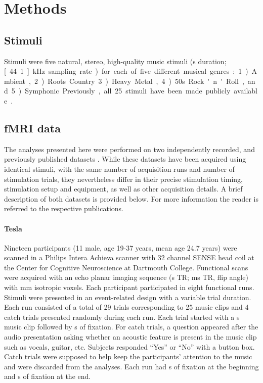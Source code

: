 \section*{Methods}

\subsection*{Stimuli}

Stimuli were five natural, stereo, high-quality music stimuli (\unit[6]{s} duration; \unit[44.1]{kHz} sampling rate) for each of five different musical genres: 1) Ambient, 2) Roots Country 3) Heavy Metal, 4) 50s Rock'n'Roll, and 5) Symphonic. Previously, all 25 stimuli have been made publicly available \citep{HDH+2015}.

\subsection*{f{MRI} data}

The analyses presented here were performed on two independently recorded, and previously published datasets \citep{CTK+2012,HDH+2015}. While these datasets have been acquired using identical stimuli, with the same number of acquisition runs and number of stimulation trials, they nevertheless differ in their precise stimulation timing, stimulation setup and equipment, as well as other acquisition details. A brief description of both datasets is provided below. For more information the reader is referred to the respective publications.

\paragraph{\unit[3]{Tesla}}
%
Nineteen participants (11 male, age 19-37 years, mean age 24.7 years) were scanned in a Philips Intera Achieva scanner with 32 channel SENSE head coil at the Center for Cognitive Neuroscience at Dartmouth College. Functional scans were acquired with an echo planar imaging sequence (\unit[2]{s} TR; \unit[35]{ms} TR, \unit[90]{\textdegree} flip angle) with \unit[3]{mm} isotropic voxels.
Each participant participated in eight functional runs. Stimuli were presented in an event-related design with a variable trial duration. Each run consisted of a total of 29 trials corresponding to 25 music clips and 4 catch trials presented randomly during each run. Each trial started with a \unit[6]{s} music clip followed by \unit[4-8]{s} of fixation. For catch trials, a question appeared after the audio presentation asking whether an acoustic feature is present in the music clip such as vocals, guitar, etc. Subjects responded “Yes” or “No” with a button box. Catch trials were supposed to help keep the participants’ attention to the music and were discarded from the analyses. Each run had \unit[4]{s} of fixation at the beginning and \unit[10]{s} of fixation at the end.

